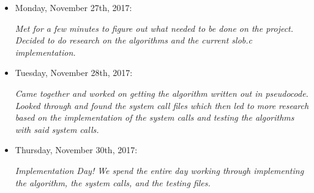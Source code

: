 \documentclass[10pt,drafclsnofoot,onecolumn]{IEEEtran}
\begin{document}
\begin{itemize}
\item{Monday, November 27th, 2017:}

\textsl{Met for a few minutes to figure out what needed to be done on the project. Decided to do research on the algorithms and the current slob.c implementation.}

\item{Tuesday, November 28th, 2017:}

\textsl{Came together and worked on getting the algorithm written out in pseudocode. Looked through and found the system call files which then led to more research based on the implementation of the system calls and testing the algorithms with said system calls.}

\item{Thursday, November 30th, 2017:}

\textsl{Implementation Day! We spend the entire day working through implementing the algorithm, the system calls, and the testing files.}

\end{itemize}
\end{document}
